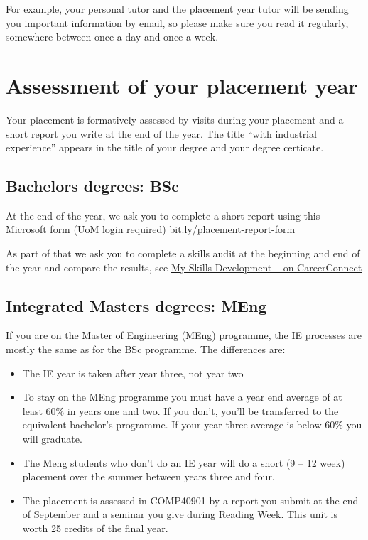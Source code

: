 \documentclass[
]{book}
\providecommand{\tightlist}{%
  \setlength{\itemsep}{0pt}\setlength{\parskip}{0pt}}
\begin{document}
For example, your personal tutor and the placement year tutor will be sending you important information by email, so please make sure you read it regularly, somewhere between once a day and once a week.

\chapter{Assessment of your placement year}\label{assessment}

Your placement is formatively assessed by visits during your placement and a short report you write at the end of the year. The title ``with industrial experience'' appears in the title of your degree and your degree certicate.

\section{Bachelors degrees: BSc}\label{bsc}

At the end of the year, we ask you to complete a short report using this Microsoft form (UoM login required) \href{https://bit.ly/placement-report-form}{bit.ly/placement-report-form}

As part of that we ask you to complete a skills audit at the beginning and end of the year and compare the results, see \href{https://www.careers.manchester.ac.uk/options/skills/myskills}{My Skills Development -- on CareerConnect} \citep{audit}

\section{Integrated Masters degrees: MEng}\label{meng}

If you are on the Master of Engineering (MEng) programme, the IE processes are mostly the same as for the BSc programme. The differences are:

\begin{itemize}
\tightlist
\item
  The IE year is taken after year three, not year two
\item
  To stay on the MEng programme you must have a year end average of at least 60\% in years one and two. If you don't, you'll be transferred to the equivalent bachelor's programme. If your year three average is below 60\% you will graduate.
\item
  The Meng students who don't do an IE year will do a short (9 -- 12 week) placement over the summer between years three and four.
\item
  The placement is assessed in COMP40901 by a report you submit at the end of September and a seminar you give during Reading Week. This unit is worth 25 credits of the final year.
\end{itemize}
\end{document}
